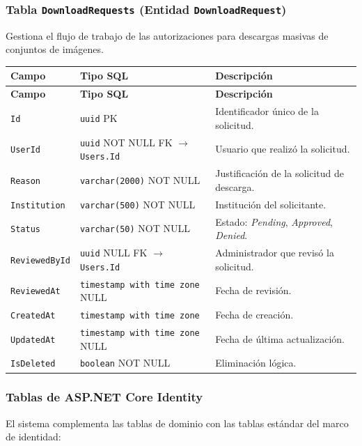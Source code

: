 \subsubsection{Tabla \texttt{DownloadRequests} (Entidad \texttt{DownloadRequest})}
Gestiona el flujo de trabajo de las autorizaciones para descargas masivas de conjuntos de imágenes.

\begin{longtable}{|p{3.5cm}|p{4cm}|p{7cm}|}
\hline
\textbf{Campo} & \textbf{Tipo SQL} & \textbf{Descripción} \\
\hline
\endfirsthead
\hline
\textbf{Campo} & \textbf{Tipo SQL} & \textbf{Descripción} \\
\hline
\endhead
\texttt{Id} & \texttt{uuid} PK & Identificador único de la solicitud. \\
\hline
\texttt{UserId} & \texttt{uuid} NOT NULL FK $\rightarrow$ \texttt{Users.Id} & Usuario que realizó la solicitud. \\
\hline
\texttt{Reason} & \texttt{varchar(2000)} NOT NULL & Justificación de la solicitud de descarga. \\
\hline
\texttt{Institution} & \texttt{varchar(500)} NOT NULL & Institución del solicitante. \\
\hline
\texttt{Status} & \texttt{varchar(50)} NOT NULL & Estado: \textit{Pending}, \textit{Approved}, \textit{Denied}. \\
\hline
\texttt{ReviewedById} & \texttt{uuid} NULL FK $\rightarrow$ \texttt{Users.Id} & Administrador que revisó la solicitud. \\
\hline
\texttt{ReviewedAt} & \texttt{timestamp with time zone} NULL & Fecha de revisión. \\
\hline
\texttt{CreatedAt} & \texttt{timestamp with time zone} & Fecha de creación. \\
\hline
\texttt{UpdatedAt} & \texttt{timestamp with time zone} NULL & Fecha de última actualización. \\
\hline
\texttt{IsDeleted} & \texttt{boolean} NOT NULL & Eliminación lógica. \\
\hline
\end{longtable}

\subsubsection{Tablas de ASP.NET Core Identity}
El sistema complementa las tablas de dominio con las tablas estándar del marco de identidad:

